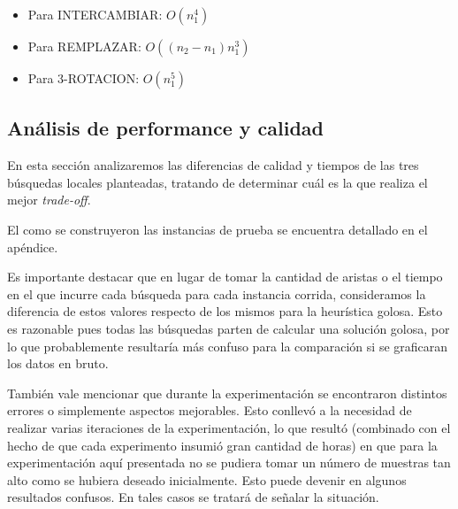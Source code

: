\begin{itemize}
\item Para INTERCAMBIAR: $O(n_1^4)$
\item Para REMPLAZAR: $O((n_2-n_1) n_1^3)$
\item Para 3-ROTACION: $O(n_1^5)$
\end{itemize}

\subsection{Análisis de performance y calidad}
En esta sección analizaremos las diferencias de calidad y tiempos de las tres búsquedas locales planteadas, tratando de determinar cuál es la que realiza el mejor \emph{trade-off}.

El como se construyeron las instancias de prueba se encuentra detallado en el apéndice.

Es importante destacar que en lugar de tomar la cantidad de aristas o el tiempo en el que incurre cada búsqueda para cada instancia corrida, consideramos la diferencia de estos valores respecto de los mismos para la heurística golosa. Esto es razonable pues todas las búsquedas parten de calcular una solución golosa, por lo que probablemente resultaría más confuso para la comparación si se graficaran los datos en bruto.

También vale mencionar que durante la experimentación se encontraron distintos errores o simplemente aspectos mejorables. Esto conllevó a la necesidad de realizar varias iteraciones de la experimentación, lo que resultó (combinado con el hecho de que cada experimento insumió gran cantidad de horas) en que para la experimentación aquí presentada no se pudiera tomar un número de muestras tan alto como se hubiera deseado inicialmente. Esto puede devenir en algunos resultados confusos. En tales casos se tratará de señalar la situación.

